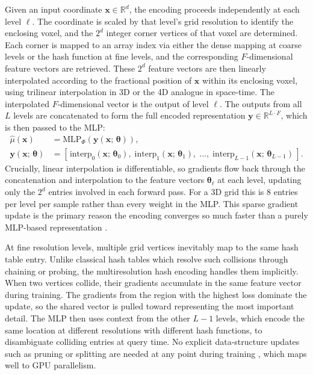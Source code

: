 \documentclass[12pt, a4paper, twoside]{report}
\begin{document}
Given an input coordinate $\mathbf{x} \in \mathbb{R}^d$, the encoding proceeds independently at each level $\ell$. The coordinate is scaled by that level's grid resolution to identify the enclosing voxel, and the $2^d$ integer corner vertices of that voxel are determined. Each corner is mapped to an array index via either the dense mapping at coarse levels or the hash function at fine levels, and the corresponding $F$-dimensional feature vectors are retrieved. These $2^d$ feature vectors are then linearly interpolated according to the fractional position of $\mathbf{x}$ within its enclosing voxel, using trilinear interpolation in 3D or the 4D analogue in space-time. The interpolated $F$-dimensional vector is the output of level $\ell$. The outputs from all $L$ levels are concatenated to form the full encoded representation $\mathbf{y} \in \mathbb{R}^{L \cdot F}$, which is then passed to the MLP:
%
\begin{equation}
\begin{aligned}
    \hat{\mu}(\mathbf{x}) &= \mathrm{MLP}_\Phi\!\left(\mathbf{y}(\mathbf{x};\, \boldsymbol{\theta})\right), \\[4pt]
    \mathbf{y}(\mathbf{x};\, \boldsymbol{\theta}) &= \left[\,
        \mathrm{interp}_0(\mathbf{x};\, \boldsymbol{\theta}_0),\;
        \mathrm{interp}_1(\mathbf{x};\, \boldsymbol{\theta}_1),\;
        \ldots,\;
        \mathrm{interp}_{L-1}(\mathbf{x};\, \boldsymbol{\theta}_{L-1})
    \,\right].
\end{aligned}
    \label{eq:hash_forward}
\end{equation}
%
Crucially, linear interpolation is differentiable, so gradients flow back through the concatenation and interpolation to the feature vectors $\boldsymbol{\theta}_\ell$ at each level, updating only the $2^d$ entries involved in each forward pass. For a 3D grid this is 8 entries per level per sample rather than every weight in the MLP. This sparse gradient update is the primary reason the encoding converges so much faster than a purely MLP-based representation \citep{mueller2022instant}.

At fine resolution levels, multiple grid vertices inevitably map to the same hash table entry. Unlike classical hash tables which resolve such collisions through chaining or probing, the multiresolution hash encoding handles them implicitly. When two vertices collide, their gradients accumulate in the same feature vector during training. The gradients from the region with the highest loss dominate the update, so the shared vector is pulled toward representing the most important detail. The MLP then uses context from the other $L - 1$ levels, which encode the same location at different resolutions with different hash functions, to disambiguate colliding entries at query time. No explicit data-structure updates such as pruning or splitting are needed at any point during training \citep{mueller2022instant}, which maps well to GPU parallelism.
\end{document}
